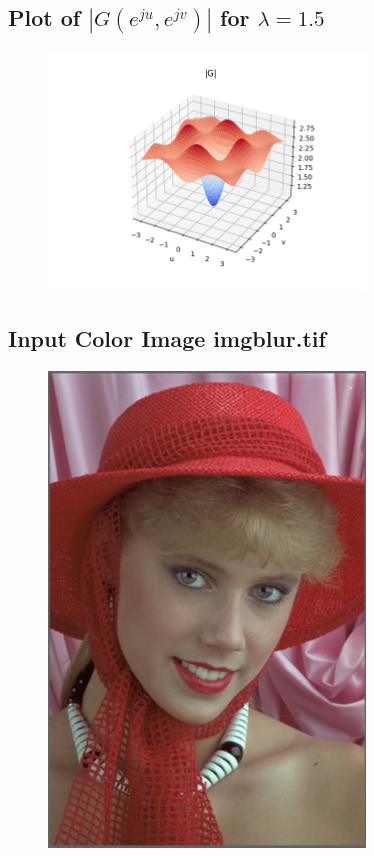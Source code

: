 \documentclass{article}
\begin{document}
\subsection{Plot of $|G(e^{ju}, e^{jv})|$ for $\lambda = 1.5$}
\begin{figure}[H]
    \centering
    \includegraphics[width=0.75\textwidth]{../results/section4-G-python.png}
    \begin{center}
    \end{center}
\end{figure}
\subsection{Input Color Image imgblur.tif}
\begin{figure}[H]
    \centering
    \includegraphics[width=0.75\textwidth]{../results/imgblur.png}
    \begin{center}
    \end{center}
\end{figure}
\end{document}
